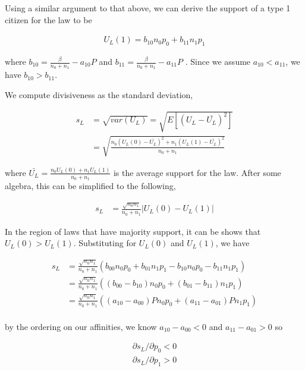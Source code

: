 Using a similar argument to that above, we can derive the support of a type 1 citizen for the law to be

\begin{align}
U_L(1) =  b_{10} n_0p_0 + b_{11}n_1p_1
\end{align}

where $b_{10} = \frac{\beta}{n_0 + n_1} -   a_{10}P$ and $b_{11} = \frac{\beta }{n_0 + n_1} -  a_{11}P $ .  Since we assume $a_{10} < a_{11}$, we have $b_{10} > b_{11}$.

We compute divisiveness as the standard deviation,

\begin{align}
s_L &= \sqrt{var(U_L)}  =  \sqrt{E\left[ \left(U_L - \bar{U_L} \right)^2 \right] }  \\
&= \sqrt{ \frac{ n_0\left(U_L(0) - \bar{U_L}\right)^2 + n_1\left(U_L(1) - \bar{U_L} \right)^2 }{n_0+n_1}  }
\end{align}

where $\bar{U_L} = \frac{n_0 U_L(0) + n_1U_L(1) }{n_0 + n_1}$ is the average support for the law.  After some algebra, this can be simplified to the following,

\begin{align}
s_L &= \frac{\sqrt{n_0n_1}}{n_0 + n_1} \left| U_L(0) - U_L(1) \right|
\end{align}

In the region of laws that have majority support, it can be shows that $U_L(0) > U_L(1)$. Substituting for $U_L(0)$ and $U_L(1)$, we have

\begin{align}
s_L &= \frac{\sqrt{n_0n_1}}{n_0 + n_1} \left(  b_{00}n_0p_0 + b_{01} n_1p_1 - b_{10} n_0p_0 - b_{11}n_1p_1 \right) \\
&= \frac{\sqrt{n_0n_1}}{n_0 + n_1} \left(  ( b_{00} - b_{10} )n_0p_0 + ( b_{01} - b_{11})n_1p_1 \right) \\
&= \frac{\sqrt{n_0n_1}}{n_0 + n_1} \left(  ( a_{10} - a_{00} )P n_0p_0 + ( a_{11} - a_{01})P n_1p_1 \right) \\
\end{align}

by the ordering on our affinities, we know $a_{10} - a_{00}  < 0$ and $a_{11} - a_{01} > 0$ so

\begin{align}
\partial s_L / \partial p_0 <0 \\
\partial s_L / \partial p_1 >0
\end{align}

